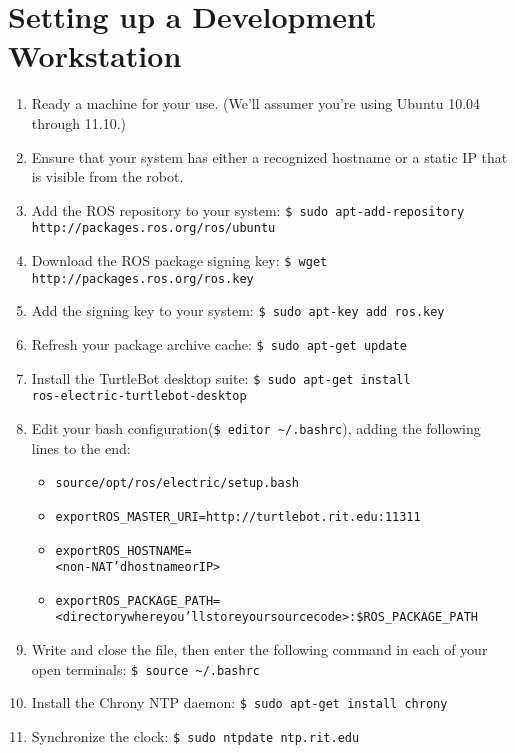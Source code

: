 \documentclass[12pt]{report}
\begin{document}
\section{Setting up a Development Workstation}
\begin{enumerate}
\item{Ready a machine for your use.  (We'll assumer you're using Ubuntu 10.04 through 11.10.)}
\item{Ensure that your system has either a recognized hostname or a static IP that is visible from the robot.}
\item{Add the ROS repository to your system: \texttt{\$\ sudo apt-add-repository http://packages.ros.org/ros/ubuntu}}
\item{Download the ROS package signing key: \texttt{\$\ wget \\ http://packages.ros.org/ros.key}}
\item{Add the signing key to your system: \texttt{\$\ sudo apt-key add ros.key}}
\item{Refresh your package archive cache: \texttt{\$\ sudo apt-get update}}
\item{Install the TurtleBot desktop suite: \texttt{\$\ sudo apt-get install \\ ros-electric-turtlebot-desktop}}
\item{Edit your bash configuration(\texttt{\$\ editor \~{}/.bashrc}), adding the following lines to the end:}
\begin{alltt}\begin{itemize}
\item{source /opt/ros/electric/setup.bash}
\item{export ROS\_MASTER\_URI=http://turtlebot.rit.edu:11311}
\item{export ROS\_HOSTNAME= \\ <non-NAT'd hostname or IP>}
\item{export ROS\_PACKAGE\_PATH= \\ <directory where you'll store your source code>:\$ROS\_PACKAGE\_PATH}
\end{itemize}\end{alltt}
\item{Write and close the file, then enter the following command in each of your open terminals: \texttt{\$\ source \~{}/.bashrc}}
\item{Install the Chrony NTP daemon: \texttt{\$\ sudo apt-get install chrony}}
\item{Synchronize the clock: \texttt{\$\ sudo ntpdate ntp.rit.edu}}
\end{enumerate}
\end{document}
